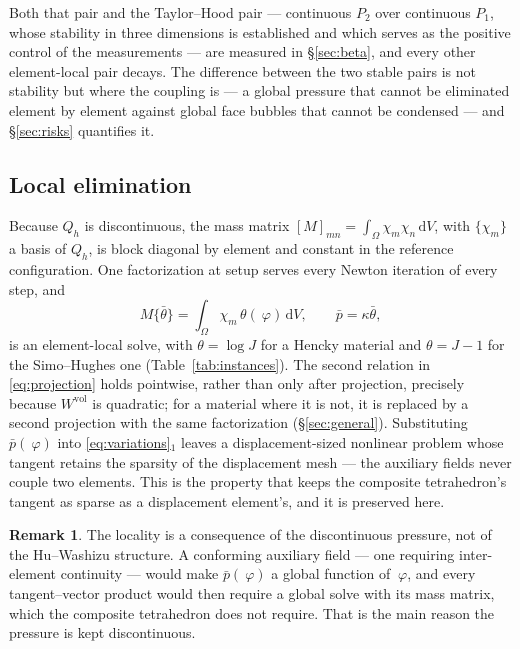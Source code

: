 \documentclass[11pt]{article}
\newcommand{\disp}{~\varphi}
\newcommand{\diff}{\,\mathrm{d}}
\newcommand{\supvol}{^{\mathrm{vol}}}
\theoremstyle{definition}
\newtheorem{remark}{Remark}
\theoremstyle{plain}
\begin{document}
Both that pair and the Taylor--Hood pair --- continuous $P_2$ over continuous
$P_1$, whose stability in three dimensions is established
\citep{BoffiBrezziFortin:2013} and which serves as the positive control of
the measurements --- are measured in \S\ref{sec:beta}, and every other
element-local pair decays. The difference between the two stable pairs is not
stability but where the coupling is --- a global pressure that cannot be
eliminated element by element against global face bubbles that cannot be
condensed --- and \S\ref{sec:risks} quantifies it.

\subsection{Local elimination}
\label{sec:local}

Because $Q_h$ is discontinuous, the mass matrix
$[M]_{mn} = \int_\Omega \chi_m \chi_n \diff V$, with $\{\chi_m\}$ a basis of
$Q_h$, is block diagonal by element and constant in the reference
configuration. One factorization at setup serves
every Newton iteration of every step, and
\begin{equation}
  \label{eq:projection}
  M \{\bar\theta\} = \int_\Omega \chi_m \, \theta(\disp) \diff V,
  \qquad
  \bar p = \kappa \bar\theta ,
\end{equation}
is an element-local solve, with $\theta = \log J$ for a Hencky material and
$\theta = J - 1$ for the Simo--Hughes one (Table~\ref{tab:instances}). The second
relation in \eqref{eq:projection} holds pointwise, rather than only
after projection, precisely because $W\supvol$ is quadratic; for a material
where it is not, it is replaced by a second projection with the same
factorization (\S\ref{sec:general}). Substituting $\bar p(\disp)$ into
\eqref{eq:variations}$_1$ leaves a displacement-sized nonlinear problem whose
tangent retains the sparsity of the displacement mesh --- the auxiliary fields
never couple two elements. This is the property that keeps the composite
tetrahedron's tangent as sparse as a displacement element's, and it is
preserved here.

\begin{remark}
The locality is a consequence of the discontinuous pressure, not of the
Hu--Washizu structure. A conforming auxiliary field --- one requiring
inter-element continuity --- would make $\bar p(\disp)$ a global function of
$\disp$, and every tangent--vector product would then require a global solve
with its mass matrix, which the composite tetrahedron does not require. That
is the main reason the pressure is kept discontinuous.
\end{remark}
\end{document}
